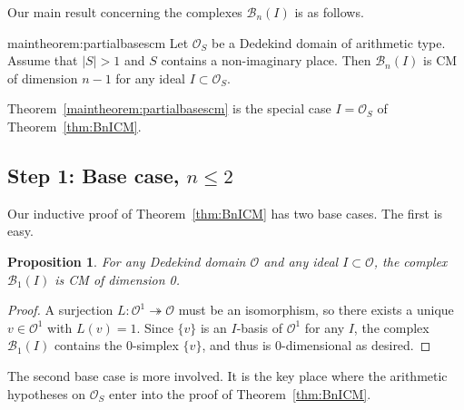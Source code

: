 \documentclass[11 pt]{article}
\newenvironment{theorem-prime}[1]{\renewcommand\theinnerthm{\ref*{#1}$'$}\innerthm}{\endinnerthm}
\theoremstyle{plain}
\newtheorem{proposition}[theorem]{Proposition}
\theoremstyle{definition}
\numberwithin{equation}{section}
\renewcommand{\O}{\mathcal{O}}
\newcommand\PartialBases{\ensuremath{\mathcal{B}}}
\newcommand{\PB}{\PartialBases}
\newcommand\onto{\twoheadrightarrow}
\newcommand\abs[1]{\left\lvert#1\right\rvert}
\begin{document}
\medskip
Our main result concerning the complexes $\PartialBases_n(I)$ is as follows.
\begin{theorem-prime}{maintheorem:partialbasescm}
\label{thm:BnICM}
 Let $\O_S$ be a Dedekind domain of arithmetic type.  Assume that $\abs{S}>1$ and $S$ contains a non-imaginary place.  Then $\PartialBases_n(I)$ is CM of dimension $n-1$ for any ideal $I \subset \O_S$.
\end{theorem-prime}

Theorem~\ref{maintheorem:partialbasescm} is the special case $I=\O_S$ of Theorem~\ref{thm:BnICM}. %




\subsection{Step 1: Base case, \texorpdfstring{$n\leq 2$}{n <= 2}}
\label{section:step1}

Our inductive proof of Theorem~\ref{thm:BnICM} has two base cases.  The first is easy.

\begin{proposition}
\label{prop:basecasen1}
For any Dedekind domain $\O$ and any ideal $I\subset \O$, the complex $\PB_1(I)$ is CM of dimension 0.
\end{proposition}
\begin{proof}
A surjection $L\colon \O^1\onto \O$ must be an isomorphism, so there exists a unique $v\in \O^1$ with $L(v)=1$. Since $\{v\}$ is an $I$-basis of $\O^1$ for any $I$, the complex $\PB_1(I)$ contains the 0-simplex $\{v\}$, and thus is 0-dimensional as desired.
\end{proof}

The second base case is more involved.   It is the key place where the arithmetic hypotheses on $\O_S$ enter into the proof of Theorem~\ref{thm:BnICM}.
\end{document}
